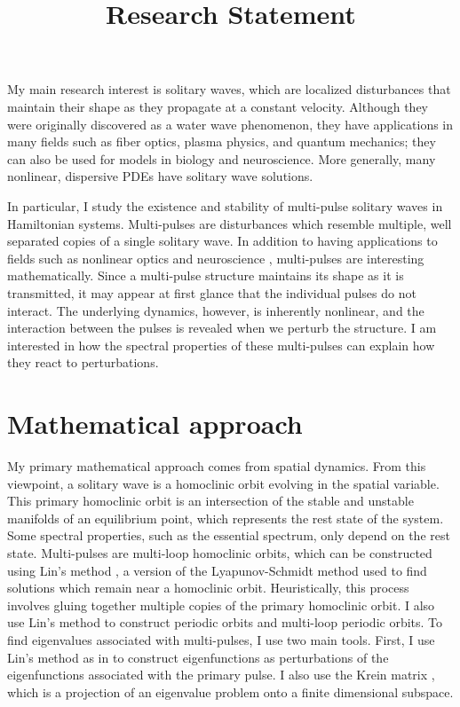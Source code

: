 \documentclass[12pt,reqno,oneside]{article}
\title{Research Statement}
\date{\vspace{-12ex}}
\theoremstyle{definition}
\theoremstyle{remark}
\begin{document}
\thispagestyle{empty}

\maketitle

My main research interest is solitary waves, which are localized disturbances that maintain their shape as they propagate at a constant velocity. Although they were originally discovered as a water wave phenomenon, they have applications in many fields such as fiber optics, plasma physics, and quantum mechanics; they can also be used for models in biology and neuroscience. More generally, many nonlinear, dispersive PDEs have solitary wave solutions.

In particular, I study the existence and stability of multi-pulse solitary waves in Hamiltonian systems. Multi-pulses are disturbances which resemble multiple, well separated copies of a single solitary wave. In addition to having applications to fields such as nonlinear optics and neuroscience \cite{Evans1982}, multi-pulses are interesting mathematically. Since a multi-pulse structure maintains its shape as it is transmitted, it may appear at first glance that the individual pulses do not interact. The underlying dynamics, however, is inherently nonlinear, and the interaction between the pulses is revealed when we perturb the structure. I am interested in how the spectral properties of these multi-pulses can explain how they react to perturbations.

\section{Mathematical approach}

My primary mathematical approach comes from spatial dynamics. From this viewpoint, a solitary wave is a homoclinic orbit evolving in the spatial variable. This primary homoclinic orbit is an intersection of the stable and unstable manifolds of an equilibrium point, which represents the rest state of the system. Some spectral properties, such as the essential spectrum, only depend on the rest state. Multi-pulses are multi-loop homoclinic orbits, which can be constructed using Lin's method \cite{Lin2008}, a version of the Lyapunov-Schmidt method used to find solutions which remain near a homoclinic orbit. Heuristically, this process involves gluing together multiple copies of the primary homoclinic orbit. I also use Lin's method to construct periodic orbits and multi-loop periodic orbits. To find eigenvalues associated with multi-pulses, I use two main tools. First, I use Lin's method as in \cite{Sandstede1998} to construct eigenfunctions as perturbations of the eigenfunctions associated with the primary pulse. I also use the Krein matrix \cite{Kapitula2013a,Kap2019}, which is a projection of an eigenvalue problem onto a finite dimensional subspace.
\end{document}
